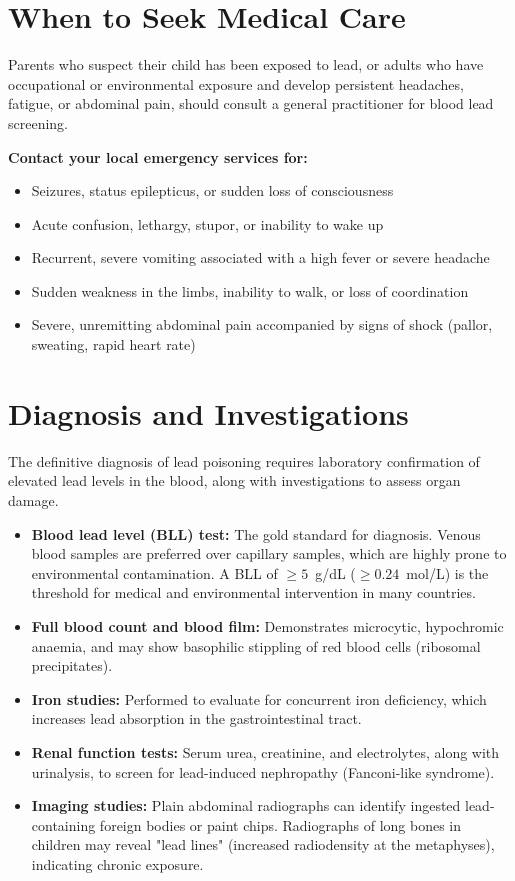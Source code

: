 \section*{When to Seek Medical Care}
Parents who suspect their child has been exposed to lead, or adults who have occupational or environmental exposure and develop persistent headaches, fatigue, or abdominal pain, should consult a general practitioner for blood lead screening.

\textbf{Contact your local emergency services for:}
\begin{itemize}
    \item Seizures, status epilepticus, or sudden loss of consciousness
    \item Acute confusion, lethargy, stupor, or inability to wake up
    \item Recurrent, severe vomiting associated with a high fever or severe headache
    \item Sudden weakness in the limbs, inability to walk, or loss of coordination
    \item Severe, unremitting abdominal pain accompanied by signs of shock (pallor, sweating, rapid heart rate)
\end{itemize}

\section*{Diagnosis and Investigations}
The definitive diagnosis of lead poisoning requires laboratory confirmation of elevated lead levels in the blood, along with investigations to assess organ damage.
\begin{itemize}
    \item \textbf{Blood lead level (BLL) test:} The gold standard for diagnosis. Venous blood samples are preferred over capillary samples, which are highly prone to environmental contamination. A BLL of $\ge 5$~\textmu{}g/dL ($\ge 0.24$~\textmu{}mol/L) is the threshold for medical and environmental intervention in many countries.
    \item \textbf{Full blood count and blood film:} Demonstrates microcytic, hypochromic anaemia, and may show basophilic stippling of red blood cells (ribosomal precipitates).
    \item \textbf{Iron studies:} Performed to evaluate for concurrent iron deficiency, which increases lead absorption in the gastrointestinal tract.
    \item \textbf{Renal function tests:} Serum urea, creatinine, and electrolytes, along with urinalysis, to screen for lead-induced nephropathy (Fanconi-like syndrome).
    \item \textbf{Imaging studies:} Plain abdominal radiographs can identify ingested lead-containing foreign bodies or paint chips. Radiographs of long bones in children may reveal "lead lines" (increased radiodensity at the metaphyses), indicating chronic exposure.
\end{itemize}

